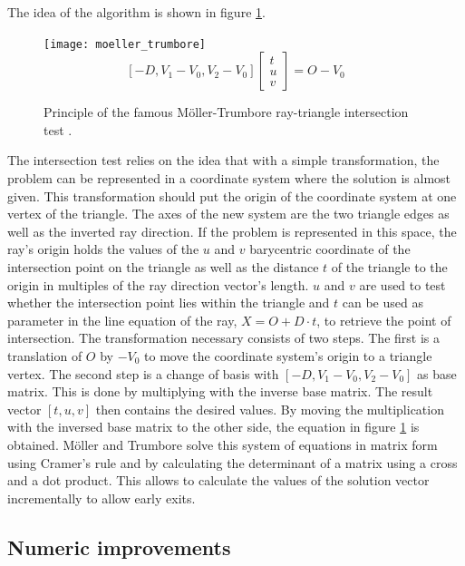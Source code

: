 The idea of the algorithm is shown in figure \ref{fig:ray_triangle_intersect}.
%
\begin{figure}
	\centering
	\texttt{[image: moeller\_trumbore]}
	\begin{equation*}
		\left[-D, V_1 - V_0, V_2 - V_0 \right] \left[ \begin{array}{c} t \\ u \\ v \end{array} \right] = O - V_0
	\end{equation*}
	\caption{
		Principle of the famous Möller-Trumbore ray-triangle intersection test \cite{enlight_demo_workshop}.
	}
	\label{fig:ray_triangle_intersect}
\end{figure}
%
The intersection test relies on the idea that with a simple transformation, the problem can be represented in a coordinate system where the solution is almost given.
This transformation should put the origin of the coordinate system at one vertex of the triangle.
The axes of the new system are the two triangle edges as well as the inverted ray direction.
If the problem is represented in this space, the ray's origin holds the values of the $u$ and $v$ barycentric coordinate of the intersection point on the triangle as well as the distance $t$ of the triangle to the origin in multiples of the ray direction vector's length.
$u$ and $v$ are used to test whether the intersection point lies within the triangle and $t$ can be used as parameter in the line equation of the ray, $X = O + D \cdot t$, to retrieve the point of intersection.
The transformation necessary consists of two steps.
The first is a translation of $O$ by $-V_0$ to move the coordinate system's origin to a triangle vertex.
The second step is a change of basis with $\left[-D, V_1 - V_0, V_2 - V_0 \right]$ as base matrix.
This is done by multiplying with the inverse base matrix.
The result vector $\left[ t,  u,  v \right]$ then contains the desired values.
By moving the multiplication with the inversed base matrix to the other side, the equation in figure \ref{fig:ray_triangle_intersect} is obtained.
Möller and Trumbore solve this system of equations in matrix form using Cramer's rule and by calculating the determinant of a matrix using a cross and a dot product.
This allows to calculate the values of the solution vector incrementally to allow early exits.


\subsection{Numeric improvements}
\label{sec:numeric_improvements}

